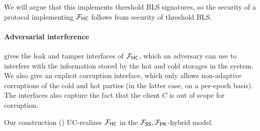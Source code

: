 We will argue that this implements threshold BLS signatures, so the security of a protocol implementing $\mathcal{F}_\mathsf{HC}$ follows from security of threshold BLS.

\paragraph{Adversarial interference}  gives the leak and tamper interfaces of $\mathcal{F}_\mathsf{HC}$, which an adversary can use to interfere with the information stored by the hot and cold storages in the system.
We also give an explicit corruption interface, which only allows non-adaptive corruptions of the cold and hot parties (in the latter case, on a per-epoch basis). The interfaces also capture the fact that the client $C$ is out of scope for corruption. 




\begin{theorem}[security]\label{thm:sec}
Our \hcwl construction () UC-realizes $\mathcal{F}_\mathsf{HC}$ in the $\mathcal{F}_\mathsf{SS},\mathcal{F}_\mathsf{PK}$-hybrid model.
\end{theorem}

